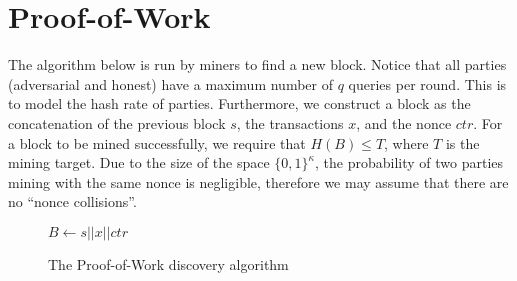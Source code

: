\section{Proof-of-Work}
The algorithm below is run by miners to find a new block. Notice that all parties (adversarial and honest) have a maximum number of $q$ queries per round. This is to model the hash rate of parties. Furthermore, we construct a block as the concatenation of the previous block $s$, the transactions $x$, and the nonce $ctr$. For a block to be mined successfully, we require that $H(B) \leq T$, where $T$ is the mining target. Due to the size of the space $\{0, 1\}^{\kappa}$, the probability of two parties mining with the same nonce is negligible, therefore we may assume that there are no ``nonce collisions''.

\begin{figure}[H]
\begin{algorithm}[H]
    \caption{\label{alg.pow} The Proof-of-Work discovery algorithm}
    \begin{algorithmic}[1]
           
           
              \State $B \leftarrow s || x || ctr$ 
               
                  \State{}
              \EndIf
          \EndFor
          \State\Return{$\bot$} 
      \EndFunction
    \end{algorithmic}
\end{algorithm}
\end{figure}

